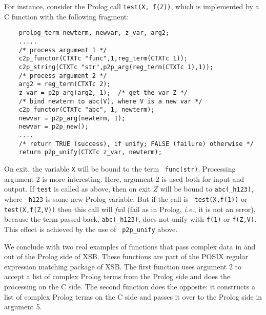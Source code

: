For instance, consider the Prolog call {\tt test(X, f(Z))},
which is implemented by a C function with the following fragment:
\begin{verbatim}
    prolog_term newterm, newvar, z_var, arg2;
    .....
    /* process argument 1 */
    c2p_functor(CTXTc "func",1,reg_term(CTXTc 1));
    c2p_string(CTXTc "str",p2p_arg(reg_term(CTXTc 1),1));
    /* process argument 2 */
    arg2 = reg_term(CTXTc 2);
    z_var = p2p_arg(arg2, 1);  /* get the var Z */
    /* bind newterm to abc(V), where V is a new var */
    c2p_functor(CTXTc "abc", 1, newterm);
    newvar = p2p_arg(newterm, 1);
    newvar = p2p_new();
    ....
    /* return TRUE (success), if unify; FALSE (failure) otherwise */
    return p2p_unify(CTXTc z_var, newterm);
\end{verbatim}
On exit, the variable {\tt X} will be bound to the term {\tt
  func(str)}.  Processing argument 2 is more interesting. Here,
argument 2 is used both for input and output. If {\tt test} is called
as above, then on exit $Z$ will be bound to {\tt abc(\_h123)}, where
{\tt \_h123} is some new Prolog variable. But if the call is {\tt
  test(X,f(1))} or {\tt test(X,f(Z,V))} then this call will
\emph{fail} (fail as in Prolog, {\it i.e.}, it is not an error),
because the term passed back, {\tt abc(\_h123)}, does not unify with
{\tt f(1)} or {\tt f(Z,V)}. This effect is achieved by the use of {\tt
  p2p\_unify} above.

We conclude with two real examples of functions that pass complex data
in and out of the Prolog side of XSB. These functions are part of the
POSIX regular expression matching package of XSB. The first function
uses argument 2 to accept a list of complex Prolog terms from the
Prolog side and does the processing on the C side. The second function
does the opposite: it constructs a list of complex Prolog terms on the
C side and passes it over to the Prolog side in argument 5.

